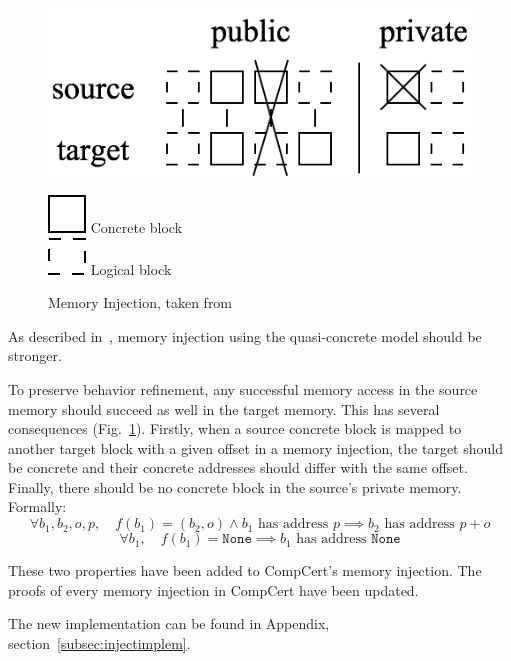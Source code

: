 \begin{figure}
\begin{minipage}{0.5\textwidth}
\includegraphics[scale=0.35]{img/meminj.png}
\end{minipage}\quad\quad
\begin{minipage}{0.5\textwidth}
\includegraphics[scale=0.35]{img/concrete.png} Concrete block\\
\includegraphics[scale=0.35]{img/logical.png} Logical block
\end{minipage}
\caption{Memory Injection, taken from~\cite{DBLP:conf/pldi/KangHMGZV15}}
\label{fig:meminj}
\end{figure}

As described in~\cite{DBLP:conf/pldi/KangHMGZV15}, memory injection using the quasi-concrete model should be stronger.

To preserve behavior refinement, any successful memory access in the source memory should succeed as well in the target memory. This has several consequences (Fig.~\ref{fig:meminj}).
Firstly, when a source concrete block is mapped to another target block with a given offset in a memory injection, the target should be concrete and their concrete addresses should differ with the same offset.
Finally, there should be no concrete block in the source's private memory.
Formally:
$$\forall b_1,b_2,o,p,\quad f(b_1)=(b_2,o)\wedge b_1\text{ has address }p\implies b_2\text{ has address }p+o$$
$$\forall b_1,\quad f(b_1)=\texttt{None}\implies b_1\text{ has address }\texttt{None}$$

These two properties have been added to CompCert's memory injection. The proofs of every memory injection in CompCert have been updated.

The new implementation can be found in Appendix, section~\ref{subsec:injectimplem}.
